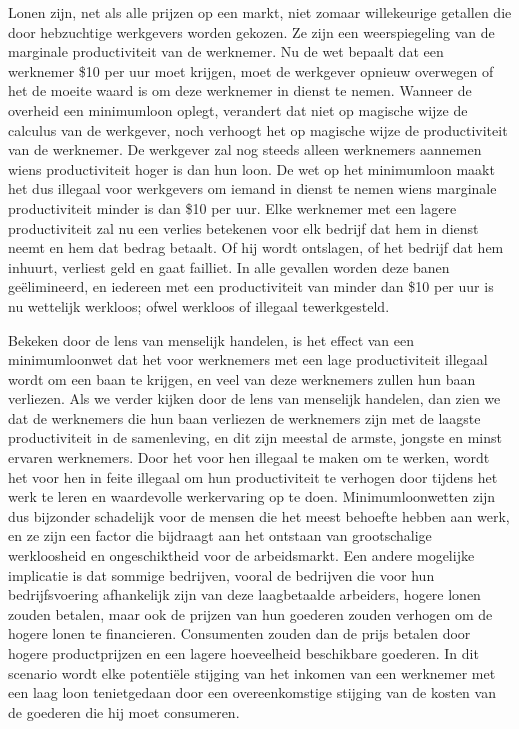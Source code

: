 Lonen zijn, net als alle prijzen op een markt, niet zomaar willekeurige getallen die door hebzuchtige werkgevers worden gekozen. Ze zijn een weerspiegeling van de marginale productiviteit van de werknemer. Nu de wet bepaalt dat een werknemer \$10 per uur moet krijgen, moet de werkgever opnieuw overwegen of het de moeite waard is om deze werknemer in dienst te nemen. Wanneer de overheid een minimumloon oplegt, verandert dat niet op magische wijze de calculus van de werkgever, noch verhoogt het op magische wijze de productiviteit van de werknemer. De werkgever zal nog steeds alleen werknemers aannemen wiens productiviteit hoger is dan hun loon. De wet op het minimumloon maakt het dus illegaal voor werkgevers om iemand in dienst te nemen wiens marginale productiviteit minder is dan \$10 per uur. Elke werknemer met een lagere productiviteit zal nu een verlies betekenen voor elk bedrijf dat hem in dienst neemt en hem dat bedrag betaalt. Of hij wordt ontslagen, of het bedrijf dat hem inhuurt, verliest geld en gaat failliet. In alle gevallen worden deze banen geëlimineerd, en iedereen met een productiviteit van minder dan \$10 per uur is nu wettelijk werkloos; ofwel werkloos of illegaal tewerkgesteld.

Bekeken door de lens van menselijk handelen, is het effect van een minimumloonwet dat het voor werknemers met een lage productiviteit illegaal wordt om een baan te krijgen, en veel van deze werknemers zullen hun baan verliezen. Als we verder kijken door de lens van menselijk handelen, dan zien we dat de werknemers die hun baan verliezen de werknemers zijn met de laagste productiviteit in de samenleving, en dit zijn meestal de armste, jongste en minst ervaren werknemers. Door het voor hen illegaal te maken om te werken, wordt het voor hen in feite illegaal om hun productiviteit te verhogen door tijdens het werk te leren en waardevolle werkervaring op te doen. Minimumloonwetten zijn dus bijzonder schadelijk voor de mensen die het meest behoefte hebben aan werk, en ze zijn een factor die bijdraagt aan het ontstaan van grootschalige werkloosheid en ongeschiktheid voor de arbeidsmarkt. Een andere mogelijke implicatie is dat sommige bedrijven, vooral de bedrijven die voor hun bedrijfsvoering afhankelijk zijn van deze laagbetaalde arbeiders, hogere lonen zouden betalen, maar ook de prijzen van hun goederen zouden verhogen om de hogere lonen te financieren. Consumenten zouden dan de prijs betalen door hogere productprijzen en een lagere hoeveelheid beschikbare goederen. In dit scenario wordt elke potentiële stijging van het inkomen van een werknemer met een laag loon tenietgedaan door een overeenkomstige stijging van de kosten van de goederen die hij moet consumeren.

